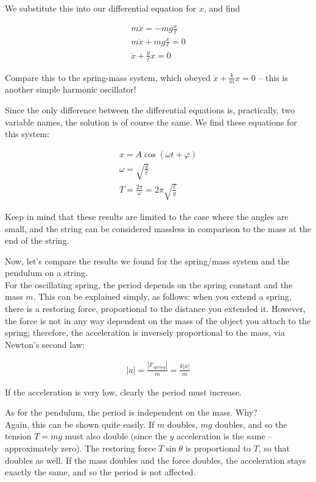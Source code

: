 \documentclass[12pt,a4paper]{report}
\begin{document}
We substitute this into our differential equation for $x$, and find

\begin{align}
m\ddot{x} = -m g \frac{x}{\ell}\\
m\ddot{x} + m g \frac{x}{\ell} = 0\\
\ddot{x} + \frac{g}{\ell} x = 0
\end{align}

Compare this to the spring-mass system, which obeyed $\displaystyle \ddot{x} + \frac{k}{m} x = 0$ -- this is another simple harmonic oscillator!

Since the only difference between the differential equations is, practically, two variable names, the solution is of course the same. We find these equations for this system:

\begin{align}
x = A \cos(\omega t + \varphi)\\
\omega = \sqrt{\frac{g}{\ell}}\\
T = \frac{2 \pi}{\omega} = 2 \pi \sqrt{\frac{\ell}{g}}
\end{align}

Keep in mind that these results are limited to the case where the angles are small, and the string can be considered massless in comparison to the mass at the end of the string.

Now, let's compare the results we found for the spring/mass system and the pendulum on a string.\\
For the oscillating spring, the period depends on the spring constant and the mass $m$. This can be explained simply, as follows: when you extend a spring, there is a restoring force, proportional to the distance you extended it. However, the force is not in any way dependent on the mass of the object you attach to the spring; therefore, the acceleration is inversely proportional to the mass, via Newton's second law:

\begin{align}
|a| = \frac{|F_{spring}|}{m} = \frac{k |x|}{m}
\end{align}

If the acceleration is very low, clearly the period must increase.

As for the pendulum, the period is independent on the mass. Why?\\
Again, this can be shown quite easily. If $m$ doubles, $m g$ doubles, and so the tension $T = m g$ must also double (since the $y$ acceleration is the same -- approximately zero). The restoring force $T \sin \theta$ is proportional to $T$, so that doubles as well. If the mass doubles and the force doubles, the acceleration stays exactly the same, and so the period is not affected.
\end{document}
